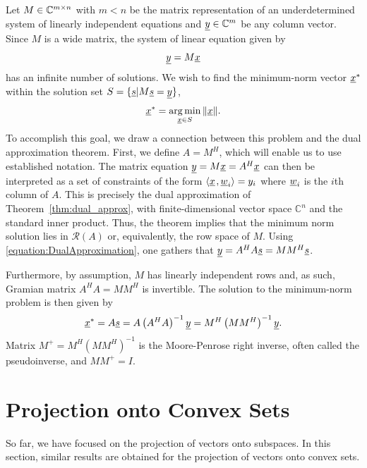 Let $M \in \mathbb{C}^{m\times n}$ with $m<n$ be the matrix representation of an underdetermined system of linearly independent equations and $\underline{y} \in \mathbb{C}^m$ be any column vector.
Since $M$ is a wide matrix, the system of linear equation given by
\begin{equation*}
\underline{y} = M \underline{x}
\end{equation*}
has an infinite number of solutions.
We wish to find the minimum-norm vector $\underline{x}^*$ within the solution set $S = \{ \underline{s} | M \underline{s} = \underline{y} \}$,
\begin{equation*}
\underline{x}^* = \operatorname*{arg\,min}_{\underline{x} \in S} \| \underline{x} \| .
\end{equation*}
To accomplish this goal, we draw a connection between this problem and the dual approximation theorem.
First, we define $A = M^H$, which will enable us to use established notation.
The matrix equation $\underline{y} = M \underline{x} = A^H \underline{x}$ can then be interpreted as a set of constraints of the form ${\left\langle  \underline{x}  \mskip2mu ,  \underline{w}_i  \right\rangle} = y_i$ where $\underline{w}_i$ is the $i$th column of $A$.
This is precisely the dual approximation of Theorem~\ref{thm:dual_approx}, with finite-dimensional vector space $\mathbb{C}^n$ and the standard inner product.
Thus, the theorem implies that the minimum norm solution lies in $\mathcal{R}(A)$ or, equivalently, the row space of $M$.
Using \eqref{equation:DualApproximation}, one gathers that $\underline{y} = A^H A \underline{s} = M M^H \underline{s}$.

Furthermore, by assumption, $M$ has linearly independent rows and, as such, Gramian matrix $A^H A = M M^H$ is invertible.
The solution to the minimum-norm problem is then given by
\begin{equation*}
\underline{x}^* = A \underline{s} = A \left( A^H A \right)^{-1} \underline{y}
= M^H \left( M M^H \right)^{-1} \underline{y} .
\end{equation*}
Matrix $M^+ = M^H \left( M M^H \right)^{-1}$ is the Moore-Penrose right inverse, often called the pseudoinverse, and $M M^+ = I$.


\section{Projection onto Convex Sets}

So far, we have focused on the projection of vectors onto subspaces.
In this section, similar results are obtained for the projection of vectors onto convex sets.

